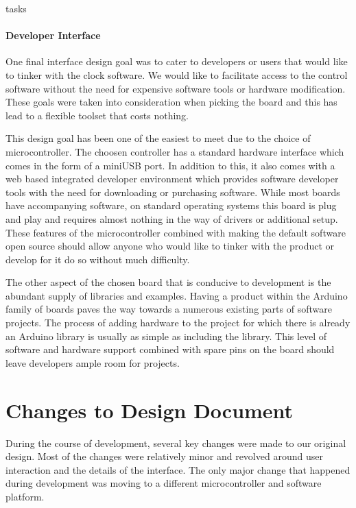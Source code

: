 tasks\documentclass[onecolumn, draftclsnofoot,10pt, compsoc]{IEEEtran}
\begin{document}
\vspace{1mm}
\paragraph{Developer Interface}

\vspace{2mm}
One final interface design goal was to cater to developers or users that would like to tinker with the clock software.
We would like to facilitate access to the control software without the need for expensive software tools or hardware modification.
These goals were taken into consideration when picking the board and this has lead to a flexible toolset that costs nothing.

\vspace{2mm}
This design goal has been one of the easiest to meet due to the choice of microcontroller.
The choosen controller has a standard hardware interface which comes in the form of a miniUSB port.
In addition to this, it also comes with a web based integrated developer environment which provides software developer tools with the need for downloading or purchasing software.
While most boards have accompanying software, on standard operating systems this board is plug and play and requires almost nothing in the way of drivers or additional setup.
These features of the microcontroller combined with making the default software open source should allow anyone who would like to tinker with the product or develop for it do so without much difficulty.

The other aspect of the chosen board that is conducive to development is the abundant supply of libraries and examples.
Having a product within the Arduino family of boards paves the way towards a numerous existing parts of software projects.
The process of adding hardware to the project for which there is already an Arduino library is usually as simple as including the library.
This level of software and hardware support combined with spare pins on the board should leave developers ample room for projects.

\section{Changes to Design Document}

During the course of development, several key changes were made to our original design.
Most of the changes were relatively minor and revolved around user interaction and the details of the interface.
The only major change that happened during development was moving to a different microcontroller and software platform.
\end{document}
